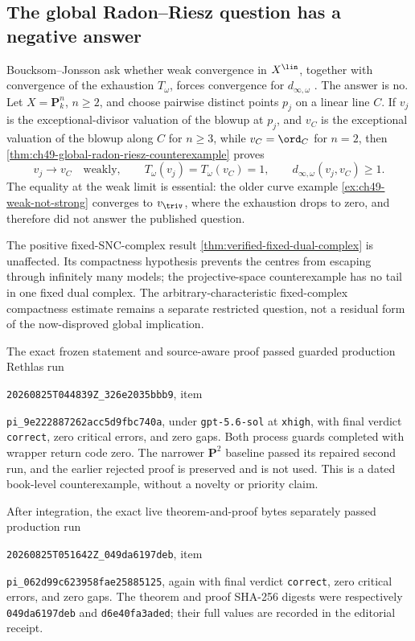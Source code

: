 \subsection{The global Radon--Riesz question has a negative answer}
\label{sec:resolved-bj-radon-riesz}

Boucksom--Jonsson ask whether weak convergence in \(X^{\lin}\), together
with convergence of the exhaustion \(T_\omega\), forces convergence for
\(d_{\infty,\omega}\) \cite[Question~11.16]{BJ22}.  The answer is no.  Let
\(X=\mathbf P^n_k\), \(n\ge2\), and choose pairwise distinct points
\(p_j\) on a linear line \(C\).  If \(v_j\) is the exceptional-divisor
valuation of the blowup at \(p_j\), and \(v_C\) is the exceptional valuation
of the blowup along \(C\) for \(n\ge3\), while \(v_C=\ord_C\) for \(n=2\),
then \cref{thm:ch49-global-radon-riesz-counterexample} proves
\[
 v_j\longrightarrow v_C\quad\text{weakly},\qquad
 T_\omega(v_j)=T_\omega(v_C)=1,
 \qquad
 d_{\infty,\omega}(v_j,v_C)\ge1.
\]
The equality at the weak limit is essential: the older curve example
\cref{ex:ch49-weak-not-strong} converges to \(v_{\triv}\), where the
exhaustion drops to zero, and therefore did not answer the published
question.

The positive fixed-SNC-complex result
\cref{thm:verified-fixed-dual-complex} is unaffected.  Its compactness
hypothesis prevents the centres from escaping through infinitely many
models; the projective-space counterexample has no tail in one fixed dual
complex.  The arbitrary-characteristic fixed-complex compactness estimate
remains a separate restricted question, not a residual form of the
now-disproved global implication.

The exact frozen statement and source-aware proof passed guarded production
Rethlas run
\par\nolinkurl{20260825T044839Z_326e2035bbb9}, item
\par\nolinkurl{pi_9e222887262acc5d9fbc740a}, under \texttt{gpt-5.6-sol} at
\texttt{xhigh}, with final verdict \texttt{correct}, zero critical errors,
and zero gaps.  Both process guards completed with wrapper return code zero.
The narrower \(\mathbf P^2\) baseline passed its repaired second run, and
the earlier rejected proof is preserved and is not used.  This is a dated
book-level counterexample, without a novelty or priority claim.

After integration, the exact live theorem-and-proof bytes separately passed
production run
\par\nolinkurl{20260825T051642Z_049da6197deb}, item
\par\nolinkurl{pi_062d99c623958fae25885125}, again with final verdict
\texttt{correct}, zero critical errors, and zero gaps.  The theorem and
proof SHA-256 digests were respectively
\texttt{049da6197deb} and \texttt{d6e40fa3aded}; their full values are
recorded in the editorial receipt.

